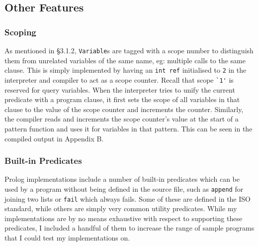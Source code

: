 \documentclass[12pt]{article}
\begin{document}
\subsection{Other Features}

\subsubsection{Scoping}

As mentioned in \S3.1.2, \verb|Variable|s are tagged with a scope number to distinguish them from unrelated variables of the same name, eg: multiple calls to the same clause.
This is simply implemented by having an \verb|int ref| initialised to \verb|2| in the interpreter and compiler to act as a scope counter.
Recall that scope \verb|`1'| is reserved for query variables.
When the interpreter tries to unify the current predicate with a program clause, it first sets the scope of all variables in that clause to the value of the scope counter and increments the counter. 
Similarly, the compiler reads and increments the scope counter's value at the start of a pattern function and uses it for variables in that pattern.
This can be seen in the compiled output in Appendix B.




\subsubsection{Built-in Predicates}

Prolog implementations include a number of built-in predicates which can be used by a program without being defined in the source file, such as \verb|append| for joining two lists or \verb|fail| which always fails. 
Some of these are defined in the ISO standard, while others are simply very common utility predicates.
While my implementations are by no means exhaustive with respect to supporting these predicates, I included a handful of them to increase the range of sample programs that I could test my implementations on.
\end{document}
